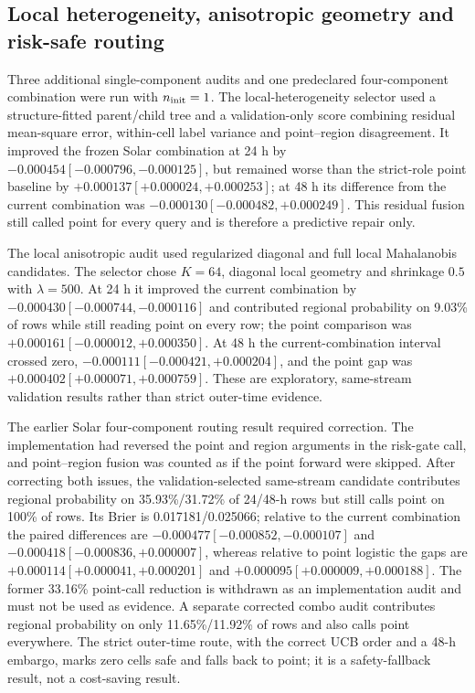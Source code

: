 \documentclass[11pt,a4paper]{article}
\numberwithin{equation}{section}
\theoremstyle{definition}\newtheorem{definition}[theorem]{Definition}
\theoremstyle{remark}\newtheorem{remark}[theorem]{Remark}
\begin{document}
\subsection{Local heterogeneity, anisotropic geometry and risk-safe routing}
\label{sec:localheterogate}
Three additional single-component audits and one predeclared four-component combination were run with $n_{\rm init}=1$. The local-heterogeneity selector used a structure-fitted parent/child tree and a validation-only score combining residual mean-square error, within-cell label variance and point--region disagreement. It improved the frozen Solar combination at 24 h by $-0.000454[-0.000796,-0.000125]$, but remained worse than the strict-role point baseline by $+0.000137[+0.000024,+0.000253]$; at 48 h its difference from the current combination was $-0.000130[-0.000482,+0.000249]$. This residual fusion still called point for every query and is therefore a predictive repair only.

The local anisotropic audit used regularized diagonal and full local Mahalanobis candidates. The selector chose $K=64$, diagonal local geometry and shrinkage $0.5$ with $\lambda=500$. At 24 h it improved the current combination by $-0.000430[-0.000744,-0.000116]$ and contributed regional probability on 9.03\% of rows while still reading point on every row; the point comparison was $+0.000161[-0.000012,+0.000350]$. At 48 h the current-combination interval crossed zero, $-0.000111[-0.000421,+0.000204]$, and the point gap was $+0.000402[+0.000071,+0.000759]$. These are exploratory, same-stream validation results rather than strict outer-time evidence.

The earlier Solar four-component routing result required correction. The implementation had reversed the point and region arguments in the risk-gate call, and point--region fusion was counted as if the point forward were skipped. After correcting both issues, the validation-selected same-stream candidate contributes regional probability on 35.93\%/31.72\% of 24/48-h rows but still calls point on 100\% of rows. Its Brier is 0.017181/0.025066; relative to the current combination the paired differences are $-0.000477[-0.000852,-0.000107]$ and $-0.000418[-0.000836,+0.000007]$, whereas relative to point logistic the gaps are $+0.000114[+0.000041,+0.000201]$ and $+0.000095[+0.000009,+0.000188]$. The former 33.16\% point-call reduction is withdrawn as an implementation audit and must not be used as evidence. A separate corrected combo audit contributes regional probability on only 11.65\%/11.92\% of rows and also calls point everywhere. The strict outer-time route, with the correct UCB order and a 48-h embargo, marks zero cells safe and falls back to point; it is a safety-fallback result, not a cost-saving result.
\end{document}
